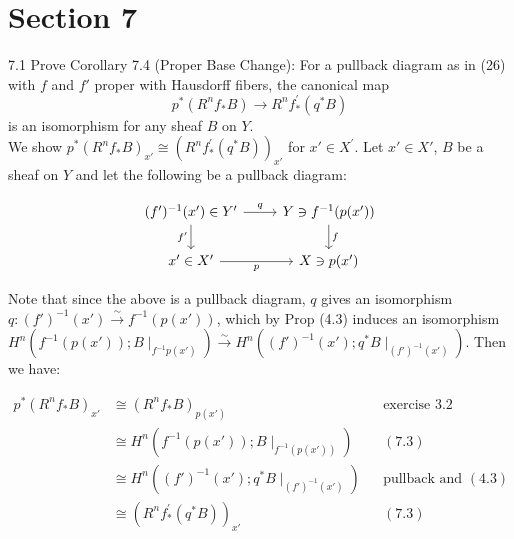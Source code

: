 \newpage
\section*{Section 7}
7.1 Prove Corollary 7.4 (Proper Base Change): For a pullback diagram as in (26) with $f$ and $f'$ proper with Hausdorff fibers, the canonical map 
\[ p^*(R^nf_*B) \rightarrow R^nf_*^{'}(q^*B)\]
is an isomorphism for any sheaf $B$ on $Y$. \\

We show $p^*(R^nf_*B)_{x'} \cong  (R^nf_*^{'}(q^*B))_{x'}$ for $x' \in X^{'}$. Let $x' \in X'$, $B$ be a sheaf on $Y$ and let the following be a pullback diagram:


\[
\begin{tikzcd}
(f')^{-1}(x') \in Y' \arrow[r, "q"] \arrow[d, "f'"']
&  Y \ni f^{-1}(p(x')) \arrow[d, "f"] \\
x' \in X' \arrow[r, "p"']
& X \ni p(x')
\end{tikzcd}
\]

Note that since the above is a pullback diagram, $q$ gives an isomorphism $q:(f')^{-1}(x') \xrightarrow{\sim} f^{-1}(p(x'))$, which by Prop (4.3) induces an isomorphism $H^n(f^{-1}(p(x'));B\mid_{f^{-1}p(x')}) \xrightarrow{\sim} H^n((f')^{-1}(x'); q^*B\mid_{(f')^{-1}(x')})$. Then we have: 

\begin{align*}
	p^*(R^nf_*B)_{x'} &\cong (R^nf_*B)_{p(x')} && \text{exercise 3.2} \\
	&\cong H^n(f^{-1}(p(x')); B\mid_{f^{-1}(p(x'))})  &&(7.3) \\
	&\cong H^n((f')^{-1}(x'); q^*B\mid_{(f')^{-1}(x')}) && \text{pullback and }(4.3)\\
	&\cong (R^nf_*^{'}(q^*B))_{x'} && (7.3)\\
\end{align*}


